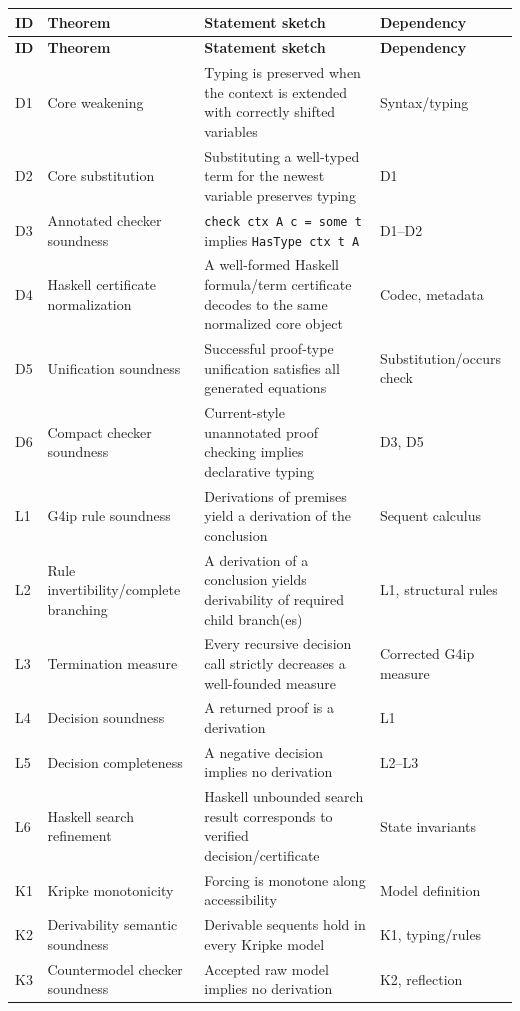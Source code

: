 \documentclass[11pt,letterpaper,openany]{report}
\theoremstyle{definition}
\theoremstyle{remark}
\newcommand{\code}[1]{\texttt{#1}}
\begin{document}
\begin{longtable}{L{0.07\textwidth} L{0.235\textwidth} L{0.365\textwidth} L{0.19\textwidth}}
\toprule
\textbf{ID} & \textbf{Theorem} & \textbf{Statement sketch} & \textbf{Dependency} \\
\midrule
\endfirsthead
\toprule
\textbf{ID} & \textbf{Theorem} & \textbf{Statement sketch} & \textbf{Dependency} \\
\midrule
\endhead
D1 & Core weakening & Typing is preserved when the context is extended with correctly shifted variables & Syntax/typing \\
D2 & Core substitution & Substituting a well-typed term for the newest variable preserves typing & D1 \\
D3 & Annotated checker soundness & \code{check ctx A c = some t} implies \code{HasType ctx t A} & D1--D2 \\
D4 & Haskell certificate normalization & A well-formed Haskell formula/term certificate decodes to the same normalized core object & Codec, metadata \\
D5 & Unification soundness & Successful proof-type unification satisfies all generated equations & Substitution/occurs check \\
D6 & Compact checker soundness & Current-style unannotated proof checking implies declarative typing & D3, D5 \\
L1 & G4ip rule soundness & Derivations of premises yield a derivation of the conclusion & Sequent calculus \\
L2 & Rule invertibility/complete branching & A derivation of a conclusion yields derivability of required child branch(es) & L1, structural rules \\
L3 & Termination measure & Every recursive decision call strictly decreases a well-founded measure & Corrected G4ip measure \\
L4 & Decision soundness & A returned proof is a derivation & L1 \\
L5 & Decision completeness & A negative decision implies no derivation & L2--L3 \\
L6 & Haskell search refinement & Haskell unbounded search result corresponds to verified decision/certificate & State invariants \\
K1 & Kripke monotonicity & Forcing is monotone along accessibility & Model definition \\
K2 & Derivability semantic soundness & Derivable sequents hold in every Kripke model & K1, typing/rules \\
K3 & Countermodel checker soundness & Accepted raw model implies no derivation & K2, reflection \\

\end{longtable}
\end{document}

